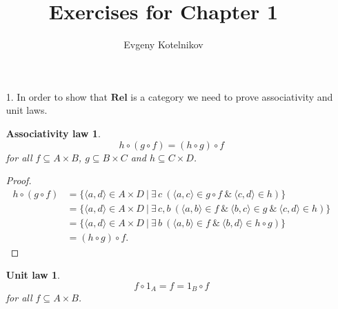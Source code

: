 \documentclass[12pt]{article}
\author{Evgeny Kotelnikov}
\title{Exercises for Chapter 1}
\date{}
\begin{document}
\maketitle

\begin{enumerate}
  \item[1.]
    In order to show that $\mathbf{Rel}$ is a category we need to prove associativity and unit laws.

    \newtheorem*{assoc}{Associativity law}
    \begin{assoc}
      $$h \circ (g \circ f) = (h \circ g) \circ f$$ for all $f \subseteq A \times B$, $g \subseteq B \times C$ and $h \subseteq C \times D$.
    \end{assoc}

    \begin{proof}
      \begin{equation*}
        \begin{array}{rl}
          h \circ (g \circ f) & = \{\langle a, d\rangle \in A \times D~|~\exists\, c~(\langle a, c \rangle \in g \circ f~\&~\langle c, d \rangle \in h) \} \\
                              & = \{\langle a, d\rangle \in A \times D~|~\exists\, c, b~(\langle a, b \rangle \in f~\&~\langle b, c \rangle \in g~\&~\langle c, d \rangle \in h) \} \\
                              & = \{\langle a, d\rangle \in A \times D~|~\exists\, b~(\langle a, b \rangle \in f~\&~\langle b, d \rangle \in h \circ g) \} \\
                              & = (h \circ g) \circ f.
        \end{array}
      \end{equation*}
    \end{proof}

    \newtheorem*{unit}{Unit law}
    \begin{unit}
      $$f \circ 1_A = f = 1_B \circ f$$ for all $f \subseteq A \times B$.
    \end{unit}


\end{enumerate}
\end{document}
